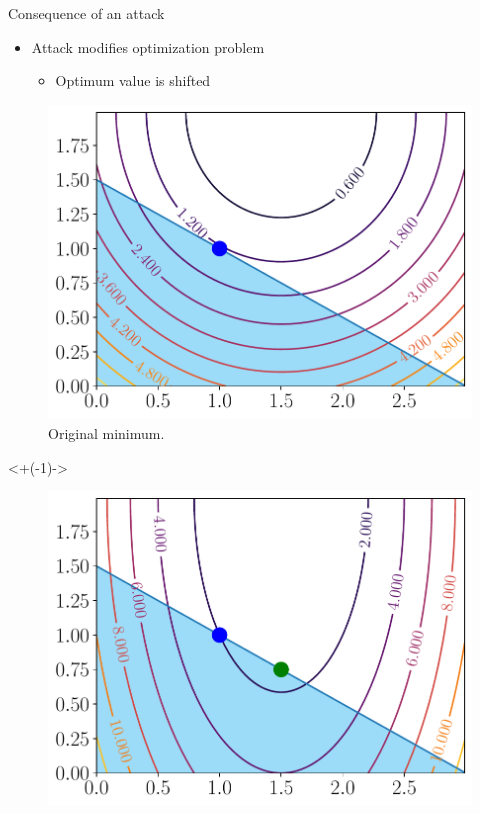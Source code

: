 \documentclass[aspectratio=169]{beamer}
\begin{document}
\begin{frame}{Consequence of an attack}
  \begin{overlayarea}{\textwidth}{.5\textwidth}
    \begin{itemize}[<+(1)->]
      \item Attack modifies optimization problem
            \begin{itemize}[<+(1)->]
              \item Optimum value is shifted
            \end{itemize}
    \end{itemize}
    \begin{minipage}[t]{.450\linewidth}
      \begin{figure}[h]
        \centering
        \includegraphics[width=\textwidth]{../img/resilient_eq/original-minimum.pdf}
        \caption*{Original minimum.}\label{fig:original_minimum}
      \end{figure}
    \end{minipage}
    \hfill
    \visible<+(-1)->{
      \begin{minipage}[t]{.45\linewidth}
        \begin{figure}[h]
          \centering
          \includegraphics[width=\textwidth]{../img/resilient_eq/new-minimum-selfish.pdf}

\end{figure}
\end{minipage}}
\end{overlayarea}
\end{frame}
\end{document}
